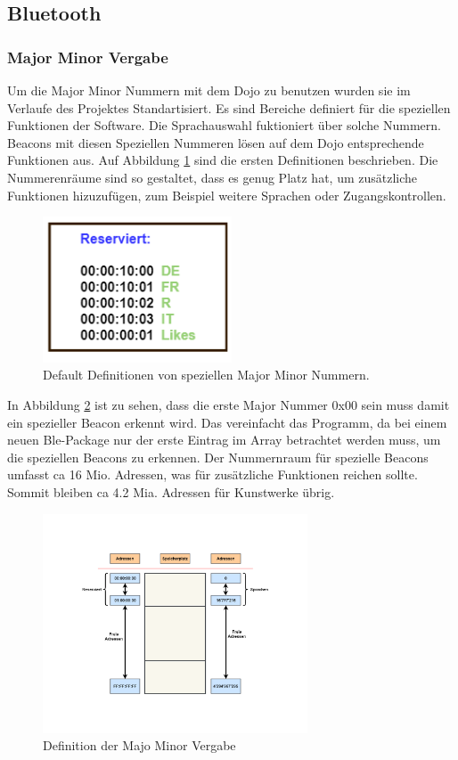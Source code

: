\subsection{Bluetooth}\label{sec:bluetooth}


\subsubsection{Major Minor Vergabe}
Um die Major Minor Nummern mit dem Dojo zu benutzen wurden sie im Verlaufe des Projektes Standartisiert. Es sind Bereiche definiert für die speziellen Funktionen der Software. Die Sprachauswahl fuktioniert über solche Nummern. Beacons mit diesen Speziellen Nummeren lösen auf dem Dojo entsprechende Funktionen aus. Auf Abbildung \ref{fig:Bluetooth_def_MM} sind die ersten Definitionen beschrieben. Die Nummerenräume sind so gestaltet, dass es genug Platz hat, um zusätzliche Funktionen hizuzufügen, zum Beispiel weitere Sprachen oder Zugangskontrollen.

\begin{figure}[htbp!!!!]
	\centering
	\includegraphics[width=0.5\textwidth]{Data/Reserviert_picture.png}
	\caption[Software:Definierte MM]{Default Definitionen von speziellen Major Minor Nummern.}
	\label{fig:Bluetooth_def_MM}
\end{figure}

In Abbildung \ref{fig:Bluetooth_MM_Vergabe} ist zu sehen, dass die erste Major Nummer 0x00 sein muss damit ein spezieller Beacon erkennt wird. Das vereinfacht das Programm, da bei einem neuen Ble-Package nur der erste Eintrag im Array betrachtet werden muss, um die speziellen Beacons zu erkennen. Der Nummernraum für spezielle Beacons umfasst ca 16 Mio. Adressen, was für zusätzliche Funktionen reichen sollte. Sommit bleiben ca 4.2 Mia. Adressen für Kunstwerke übrig.


\begin{figure}[htbp!!!!]
	\centering
	\includegraphics[width=0.7\textwidth]{Data/Speicheradressen_picture.png}
	\caption[Software:MM Vergabe]{Definition der Majo Minor Vergabe}
	\label{fig:Bluetooth_MM_Vergabe}
\end{figure}



